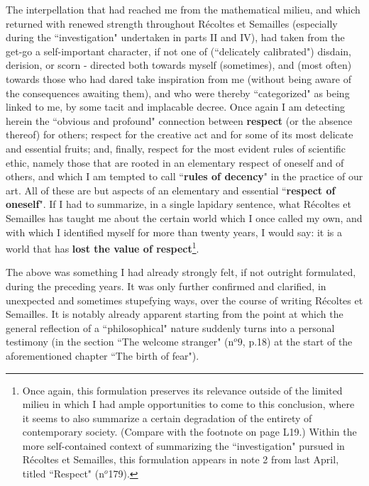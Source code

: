 The interpellation that had reached me from the mathematical milieu, and which returned with renewed strength throughout R\'ecoltes et Semailles (especially during the ``investigation" undertaken in parts II and IV), had taken from the get-go a self-important character, if not one of (``delicately calibrated") disdain, derision, or scorn - directed both towards myself (sometimes), and (most often) towards those who had dared take inspiration from me (without being aware of the consequences awaiting them), and who were thereby ``categorized" as being linked to me, by some tacit and implacable decree. Once again I am detecting herein the ``obvious and profound" connection between \textbf{respect} (or the absence thereof) for others; respect for the creative act and for some of its most delicate and essential fruits; and, finally, respect for the most evident rules of scientific ethic, namely those that are rooted in an elementary respect of oneself and of others, and which I am tempted to call ``\textbf{rules of decency}" in the practice of our art. All of these are but aspects of an elementary and essential ``\textbf{respect of oneself}". If I had to summarize, in a single lapidary sentence, what R\'ecoltes et Semailles has taught me about the certain world which I once called my own, and with which I identified myself for more than twenty years, I would say: it is a world that has \textbf{lost the value of respect}\footnote{Once again, this formulation preserves its relevance outside of the limited milieu in which I had ample opportunities to come to this conclusion, where it seems to also summarize a certain degradation of the entirety of contemporary society. (Compare with the footnote on page L19.)
Within the more self-contained context of summarizing the ``investigation" pursued in R\'ecoltes et Semailles, this formulation appears in note 2 from last April, titled ``Respect" (n$^o$179).}.

The above was something I had already strongly felt, if not outright formulated, during the preceding years. It was only further confirmed and clarified, in unexpected and sometimes stupefying ways, over the course of writing R\'ecoltes et Semailles. It is notably already apparent starting from the point at which the general reflection of a ``philosophical" nature suddenly turns into a personal testimony (in the section ``The welcome stranger" (n$^o9$, p.18) at the start of the aforementioned chapter ``The birth of fear").

